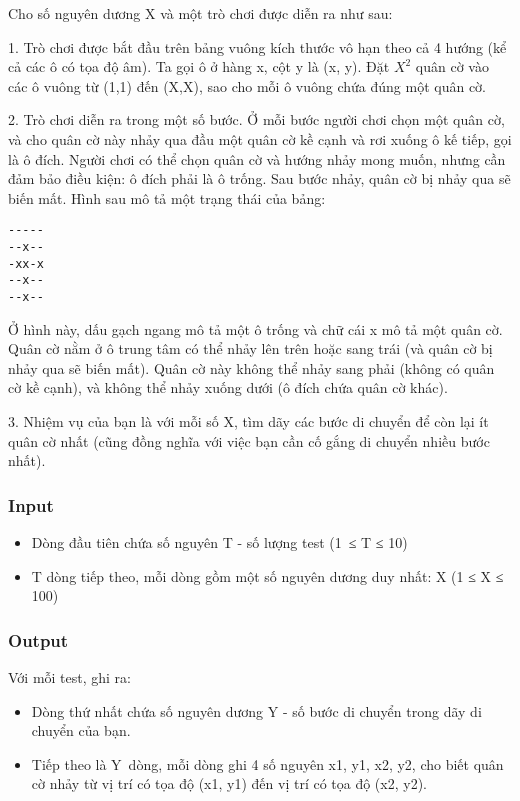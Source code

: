 



    Cho số nguyên dương X và một trò chơi được diễn ra như sau:   

   1. Trò chơi được bắt đầu trên bảng vuông kích thước vô hạn theo cả 4 hướng (kể cả các ô có tọa độ âm). Ta gọi ô ở hàng x, cột y là (x, y). Đặt $X^{2}$   quân cờ vào các ô vuông từ (1,1) đến (X,X), sao cho mỗi ô vuông chứa đúng một quân cờ.  

   2. Trò chơi diễn ra trong một số bước. Ở mỗi bước người chơi chọn một quân cờ, và cho quân cờ này nhảy qua đầu một quân cờ kề cạnh và rơi xuống ô kế tiếp, gọi là ô đích. Người chơi có thể chọn quân cờ và hướng nhảy mong muốn, nhưng cần đảm bảo điều kiện: ô đích phải là ô trống. Sau bước nhảy, quân cờ bị nhảy qua sẽ biến mất. Hình sau mô tả một trạng thái của bảng:  
\begin{verbatim}
-----
--x--
-xx-x
--x--
--x--\end{verbatim}

   Ở hình này, dấu gạch ngang mô tả một ô trống và chữ cái x mô tả một quân cờ. Quân cờ nằm ở ô trung tâm có thể nhảy lên trên hoặc sang trái (và quân cờ bị nhảy qua sẽ biến mất). Quân cờ này không thể nhảy sang phải (không có quân cờ kề cạnh), và không thể nhảy xuống dưới (ô đích chứa quân cờ khác).  

   3. Nhiệm vụ của bạn là với mỗi số X, tìm dãy các bước di chuyển để còn lại ít quân cờ nhất (cũng đồng nghĩa với việc bạn cần cố gắng di chuyển nhiều bước nhất).  

\subsubsection{   Input  }
\begin{itemize}
	\item     Dòng đầu tiên chứa số nguyên T - số lượng test (1 ≤ T ≤ 10)   
	\item     T dòng tiếp theo, mỗi dòng gồm một số nguyên dương duy nhất: X (1 ≤ X ≤ 100)   
\end{itemize}

\subsubsection{   Output  }

   Với mỗi test, ghi ra:  
\begin{itemize}
	\item     Dòng thứ nhất chứa số nguyên dương Y - số bước di chuyển trong dãy di chuyển của bạn.   
	\item     Tiếp theo là Y dòng, mỗi dòng ghi 4 số nguyên x1, y1, x2, y2, cho biết quân cờ nhảy từ vị trí có tọa độ (x1, y1) đến vị trí có tọa độ (x2, y2).   
\end{itemize}


